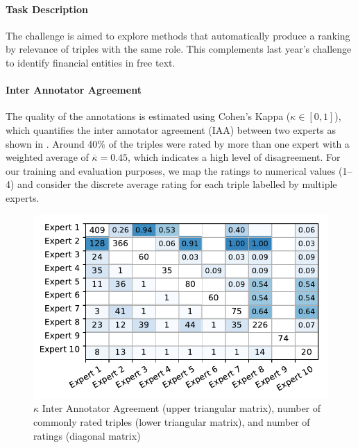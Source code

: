 {\setlength{\parindent}{0cm}
\paragraph{\textbf{Task Description}}
The challenge is aimed to explore methods that automatically produce a ranking by relevance of triples with the same role.
This complements last year's challenge to identify financial entities in free text\cite{dsmm16}.
}

{\setlength{\parindent}{0cm}
\paragraph{\textbf{Inter Annotator Agreement}}
The quality of the annotations is estimated using Cohen's Kappa\cite{ir} ($\kappa\in [0,1]$), which quantifies the inter annotator agreement (IAA) between two experts as shown in .
Around 40\% of the triples were rated by more than one expert with a weighted average of $\overline{\kappa}=0.45$, which indicates a high level of disagreement.
For our training and evaluation purposes, we map the ratings to numerical values (1--4) and consider the discrete average rating for each triple labelled by multiple experts.
}
\begin{figure}[b]
	\includegraphics[width=0.8\linewidth]{iaa}
	\caption{$\kappa$ Inter Annotator Agreement (upper triangular matrix), number of commonly rated triples (lower triangular matrix), and number of ratings (diagonal matrix)}
	\label{fig:iaa}
\end{figure}


